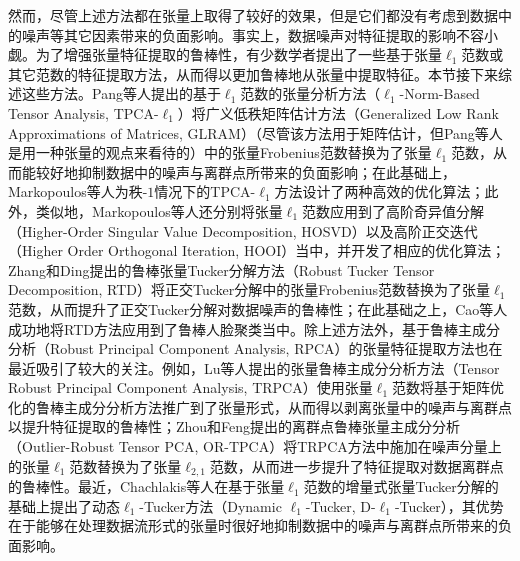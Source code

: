 然而，尽管上述方法都在张量上取得了较好的效果，但是它们都没有考虑到数据中的噪声等其它因素带来的负面影响。事实上，数据噪声对特征提取的影响不容小觑。为了增强张量特征提取的鲁棒性，有少数学者提出了一些基于张量$\ell_{1}$范数或其它范数的特征提取方法，从而得以更加鲁棒地从张量中提取特征。本节接下来综述这些方法。Pang等人提出的基于$\ell_{1}$范数的张量分析方法（$\ell_{1}$-Norm-Based Tensor Analysis, TPCA-$\ell_{1}$）将广义低秩矩阵估计方法（Generalized Low Rank Approximations of Matrices, GLRAM）（尽管该方法用于矩阵估计，但Pang等人是用一种张量的观点来看待的）中的张量Frobenius范数替换为了张量$\ell_{1}$范数，从而能较好地抑制数据中的噪声与离群点所带来的负面影响；在此基础上，Markopoulos等人为秩-$1$情况下的TPCA-$\ell_{1}$方法设计了两种高效的优化算法；此外，类似地，Markopoulos等人还分别将张量$\ell_{1}$范数应用到了高阶奇异值分解（Higher-Order Singular Value Decomposition, HOSVD）以及高阶正交迭代（Higher Order Orthogonal Iteration, HOOI）当中，并开发了相应的优化算法；Zhang和Ding提出的鲁棒张量Tucker分解方法（Robust Tucker Tensor Decomposition, RTD）将正交Tucker分解中的张量Frobenius范数替换为了张量$\ell_{1}$范数，从而提升了正交Tucker分解对数据噪声的鲁棒性；在此基础之上，Cao等人成功地将RTD方法应用到了鲁棒人脸聚类当中。除上述方法外，基于鲁棒主成分分析（Robust Principal Component Analysis, RPCA）的张量特征提取方法也在最近吸引了较大的关注。例如，Lu等人提出的张量鲁棒主成分分析方法（Tensor Robust Principal Component Analysis, TRPCA）使用张量$\ell_{1}$范数将基于矩阵优化的鲁棒主成分分析方法推广到了张量形式，从而得以剥离张量中的噪声与离群点以提升特征提取的鲁棒性；Zhou和Feng提出的离群点鲁棒张量主成分分析（Outlier-Robust Tensor PCA, OR-TPCA）将TRPCA方法中施加在噪声分量上的张量$\ell_{1}$范数替换为了张量$\ell_{2,1}$范数，从而进一步提升了特征提取对数据离群点的鲁棒性。最近，Chachlakis等人在基于张量$\ell_{1}$范数的增量式张量Tucker分解的基础上提出了动态$\ell_{1}$-Tucker方法（Dynamic $\ell_{1}$-Tucker, D-$\ell_{1}$-Tucker），其优势在于能够在处理数据流形式的张量时很好地抑制数据中的噪声与离群点所带来的负面影响。


